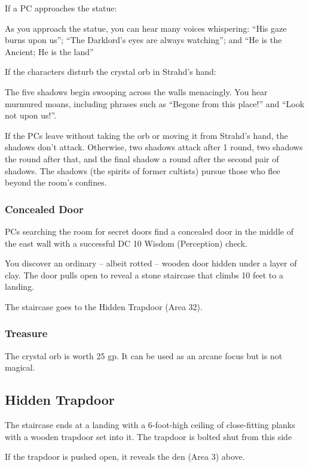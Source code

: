 If a PC approaches the statue:
\begin{readout}
  As you approach the statue, you can hear many voices whispering: ``His gaze burns upon us''; ``The Darklord's
  eyes are always watching''; and ``He is the Ancient; He is the land''
\end{readout}

If the characters disturb the crystal orb in Strahd's hand:
\begin{readout}
  The five shadows begin swooping across the walls menacingly. You hear murmured moans, including phrases
  such as ``Begone from this place!'' and ``Look not upon us!''.
\end{readout}
If the PCs leave without taking the orb or moving it from Strahd's hand, the shadows don't attack. Otherwise, 
two shadows attack after 1 round, two shadows the round after that, and the final shadow a round after the
second pair of shadows. The shadows (the spirits of former cultists) pursue those who flee beyond the room's
confines.

\subsubsection*{Concealed Door}
PCs searching the room for secret doors find a concealed door in the middle of the east wall with a successful
DC 10 Wisdom (Perception) check.
\begin{readout}
  You discover an ordinary -- albeit rotted -- wooden door hidden under a layer of clay. The door pulls open
  to reveal a stone staircase that climbs 10 feet to a landing.
\end{readout}
The staircase goes to the Hidden Trapdoor (Area 32).

\subsubsection*{Treasure}
The crystal orb is worth 25 gp. It can be used as an arcane focus but is not magical.

\begin{arealinks}
\end{arealinks}


\pagebreak
\subsection{Hidden Trapdoor}
\label{sec:HiddenTrapdoor}
\begin{readout}
  The staircase ends at a landing with a 6-foot-high ceiling of close-fitting planks with a wooden trapdoor
  set into it. The trapdoor is bolted shut from this side
\end{readout}
If the trapdoor is pushed open, it reveals the den (Area 3) above.

